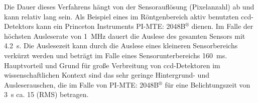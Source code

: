 \noindent
Die Dauer dieses Verfahrens hängt von der Sensorauflösung (Pixelanzahl) ab und kann relativ lang sein. Als Beispiel eines im Röntgenbereich aktiv benutzten \gls{ccd}-Detektors kann ein Princeton Instruments
PI-MTE: 2048B$^{\text{®}}$ dienen. Im Falle der höchsten Ausleserate von \SI{1}{\mega\hertz} \cite[s. 81, Readout charakterstik]{mte-manual} dauert die Auslese des gesamten Sensors mit   \SI{4,2}{\second}. Die Auslesezeit kann  durch die Auslese eines kleineren Sensorbereichs verkürzt werden und beträgt im Falle eines  Sensorunterbereichs \SI{160}{\milli\second}. Hauptvorteil und Grund für große Verbreitung von \gls{ccd}-Detektoren im wissenschaftlichen Kontext sind das sehr geringe Hintergrund- und Ausleserauschen, die im Falle von PI-MTE: 2048B$^{\text{®}}$ für eine Belichtungszeit von \SI{3}{\second} ca. \SI{15}{\electron} (RMS) betragen.

